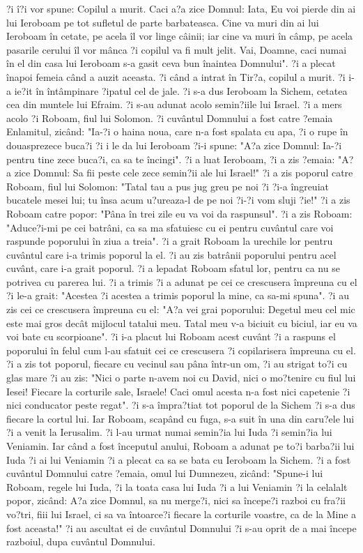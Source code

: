 ?i î?i vor spune: Copilul a murit. Caci a?a zice Domnul: Iata, Eu voi pierde din ai lui Ieroboam pe tot sufletul de parte barbateasca. Cine va muri din ai lui Ieroboam în cetate, pe acela îl vor linge câinii; iar cine va muri în câmp, pe acela pasarile cerului îl vor mânca ?i copilul va fi mult jelit. Vai, Doamne, caci numai în el din casa lui Ieroboam s-a gasit ceva bun înaintea Domnului". ?i a plecat înapoi femeia când a auzit aceasta. ?i când a intrat în Tir?a, copilul a murit. ?i i-a ie?it în întâmpinare ?ipatul cel de jale. ?i s-a dus Ieroboam la Sichem, cetatea cea din muntele lui Efraim. ?i s-au adunat acolo semin?iile lui Israel. ?i a mers acolo ?i Roboam, fiul lui Solomon. ?i cuvântul Domnului a fost catre ?emaia Enlamitul, zicând: "Ia-?i o haina noua, care n-a fost spalata cu apa, ?i o rupe în douasprezece buca?i ?i i le da lui Ieroboam ?i-i spune: "A?a zice Domnul: Ia-?i pentru tine zece buca?i, ca sa te încingi". ?i a luat Ieroboam, ?i a zis ?emaia: "A?a zice Domnul: Sa fii peste cele zece semin?ii ale lui Israel!" ?i a zis poporul catre Roboam, fiul lui Solomon: "Tatal tau a pus jug greu pe noi ?i ?i-a îngreuiat bucatele mesei lui; tu însa acum u?ureaza-l de pe noi ?i-?i vom sluji ?ie!" ?i a zis Roboam catre popor: "Pâna în trei zile eu va voi da raspunsul". ?i a zis Roboam: "Aduce?i-mi pe cei batrâni, ca sa ma sfatuiesc cu ei pentru cuvântul care voi raspunde poporului în ziua a treia". ?i a grait Roboam la urechile lor pentru cuvântul care i-a trimis poporul la el. ?i au zis batrânii poporului pentru acel cuvânt, care i-a grait poporul. ?i a lepadat Roboam sfatul lor, pentru ca nu se potrivea cu parerea lui. ?i a trimis ?i a adunat pe cei ce crescusera împreuna cu el ?i le-a grait: "Acestea ?i acestea a trimis poporul la mine, ca sa-mi spuna". ?i au zis cei ce crescusera împreuna cu el: "A?a vei grai poporului: Degetul meu cel mic este mai gros decât mijlocul tatalui meu. Tatal meu v-a biciuit cu biciul, iar eu va voi bate cu scorpioane". ?i i-a placut lui Roboam acest cuvânt ?i a raspuns el poporului în felul cum l-au sfatuit cei ce crescusera ?i copilarisera împreuna cu el. ?i a zis tot poporul, fiecare cu vecinul sau pâna într-un om, ?i au strigat to?i cu glas mare ?i au zis: "Nici o parte n-avem noi cu David, nici o mo?tenire cu fiul lui Iesei! Fiecare la corturile sale, Israele! Caci omul acesta n-a fost nici capetenie ?i nici conducator peste regat". ?i s-a împra?tiat tot poporul de la Sichem ?i s-a dus fiecare la cortul lui. Iar Roboam, scapând cu fuga, s-a suit în una din caru?ele lui ?i a venit la Ierusalim. ?i l-au urmat numai semin?ia lui Iuda ?i semin?ia lui Veniamin. Iar când a fost începutul anului, Roboam a adunat pe to?i barba?ii lui Iuda ?i ai lui Veniamin ?i a plecat ca sa se bata cu Ieroboam la Sichem. ?i a fost cuvântul Domnului catre ?emaia, omul lui Dumnezeu, zicând: "Spune-i lui Roboam, regele lui Iuda, ?i la toata casa lui Iuda ?i a lui Veniamin ?i la celalalt popor, zicând: A?a zice Domnul, sa nu merge?i, nici sa începe?i razboi cu fra?ii vo?tri, fiii lui Israel, ci sa va întoarce?i fiecare la corturile voastre, ca de la Mine a fost aceasta!" ?i au ascultat ei de cuvântul Domnului ?i s-au oprit de a mai începe razboiul, dupa cuvântul Domnului.
